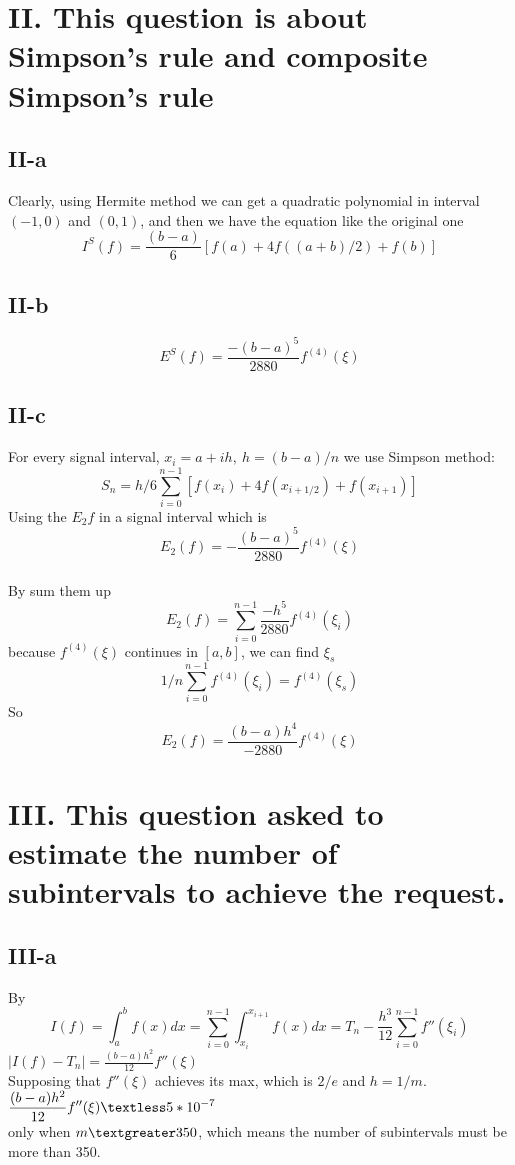 \documentclass[twoside,a4paper]{article}
\begin{document}
\section*{II. This question is about Simpson's rule and composite Simpson's rule}
\subsection*{II-a}
Clearly, using Hermite method we can get a quadratic polynomial in interval $(-1,0)$ and $(0,1)$, and then we have the equation like the original one $$I^S (f)=\frac{(b-a)}{6}[f(a)+4f((a+b)/2)+f(b)]$$ 
\subsection*{II-b}
$$
E^S(f) = \frac{-(b -a)^5}{2880}f^{(4)}(\xi)$$
\subsection*{II-c}
For every signal interval, $x_i=a+ih,  \ h=(b-a)/n$ we use Simpson method:\\
$$ S_n=h/6 \sum_{i=0}^{n-1}[f(x_i)+4f(x_{i+1/2})+f(x_{i+1})]$$
Using the $E_2 f$ in a signal interval which is $$ E_2(f)=- \frac{(b-a)^5}{2880} f^{(4)}(\xi)$$\\
By sum them up \\
$$E_2(f)=\sum_{i=0}^{n-1} \frac{-h^5}{2880} f^{(4)}(\xi_i)$$
because $f^{(4)}(\xi)$ continues in $[a,b]$, we can find $\xi_s$ \\
$$1/n \sum_{i=0}^{n-1}f^{(4)}(\xi_i)= f^{(4)}(\xi_s)$$
So $$E_2(f)=\frac{(b-a)h^4}{-2880}f^{(4)}(\xi)$$

\section*{III. This question asked to estimate the number of subintervals to achieve the request.}
\subsection*{III-a}
By \\$$ I(f)=\int_{a}^b f(x) dx= \sum_{i=0}^{n-1} \int_{x_i}^{x_{i+1}} f(x) dx =T_n-\frac{h^3}{12} \sum_{i=0}^{n-1} f''(\xi_i)$$
$|I(f)-T_n|=\displaystyle\frac{(b-a)h^2}{12}f''(\xi)$\\
Supposing that $f''(\xi)$ achieves its max, which is $2/e$ and $h=1/m$.\\
$\displaystyle\frac{(b-a)h^2}{12}f''(\xi)\textless 5*10^{-7}$\\
only when $m \textgreater 350$, which means the number of subintervals must be more than 350.\\
\end{document}
